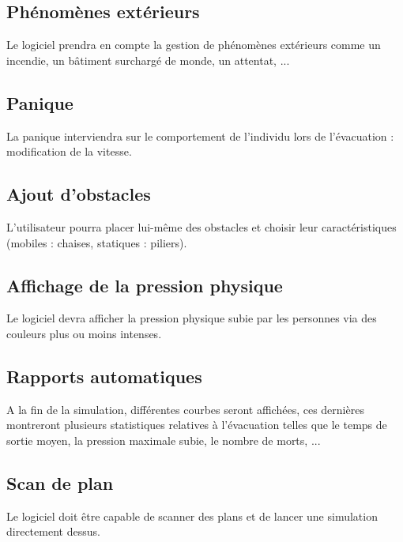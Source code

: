 \documentclass{article}
\begin{document}
    \subsection{Phénomènes extérieurs}
    Le logiciel prendra en compte la gestion de phénomènes extérieurs comme un incendie, un bâtiment surchargé de monde, un attentat, ...
        
    \subsection{Panique}
    La panique interviendra sur le comportement de l'individu lors de l'évacuation : modification de la vitesse. 

    \subsection{Ajout d'obstacles}
    L'utilisateur pourra placer lui-même des obstacles et choisir leur caractéristiques (mobiles : chaises, statiques : piliers).

    \subsection{Affichage de la pression physique}
    Le logiciel devra afficher la pression physique subie par les personnes via des couleurs plus ou moins intenses.
    
    \subsection{Rapports automatiques}
    A la fin de la simulation, différentes courbes seront affichées, ces dernières montreront plusieurs statistiques relatives à l'évacuation telles que le temps de sortie moyen, la pression maximale subie, le nombre de morts, ... 

    \subsection{Scan de plan}
    Le logiciel doit être capable de scanner des plans et de lancer une simulation directement dessus.
    
\end{document}
